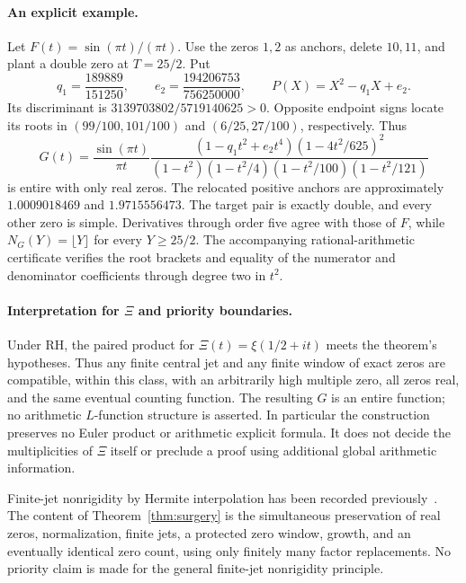 \paragraph{An explicit example.}
Let \(F(t)=\sin(\pi t)/(\pi t)\). Use the zeros \(1,2\) as anchors,
delete \(10,11\), and plant a double zero at \(T=25/2\). Put
\[
 q_1=\frac{189889}{151250},\qquad
 e_2=\frac{194206753}{756250000},\qquad
 P(X)=X^2-q_1X+e_2.
\]
Its discriminant is \(3139703802/5719140625>0\). Opposite endpoint signs
locate its roots in \((99/100,101/100)\) and \((6/25,27/100)\), respectively.
Thus
\begin{equation}
 G(t)=\frac{\sin(\pi t)}{\pi t}
 \frac{(1-q_1t^2+e_2t^4)(1-4t^2/625)^2}
 {(1-t^2)(1-t^2/4)(1-t^2/100)(1-t^2/121)}
 \label{eq:surgery-example}
\end{equation}
is entire with only real zeros. The relocated positive anchors are
approximately \(1.0009018469\) and \(1.9715556473\). The target pair is
exactly double, and every other zero is simple. Derivatives through order
five agree with those of \(F\), while
\(N_G(Y)=\lfloor Y\rfloor\) for every \(Y\ge25/2\).
The accompanying rational-arithmetic certificate verifies the root brackets
and equality of the numerator and denominator coefficients through degree
two in \(t^2\).

\paragraph{Interpretation for \(\Xi\) and priority boundaries.}
Under RH, the paired product for \(\Xi(t)=\xi(1/2+it)\) meets the theorem's
hypotheses. Thus any finite central jet and any finite window of exact zeros
are compatible, within this class, with an arbitrarily high multiple zero,
all zeros real, and the same eventual counting function. The resulting
\(G\) is an entire function; no arithmetic \(L\)-function structure is
asserted. In particular the construction preserves no Euler product or
arithmetic explicit formula. It does not decide the multiplicities of
\(\Xi\) itself or preclude a proof using additional global arithmetic
information.

Finite-jet nonrigidity by Hermite interpolation has been recorded
previously~\cite{eberwein}. The content of Theorem~\ref{thm:surgery} is the
simultaneous preservation of real zeros, normalization, finite jets, a
protected zero window, growth, and an eventually identical zero count,
using only finitely many factor replacements. No priority claim is made
for the general finite-jet nonrigidity principle.
